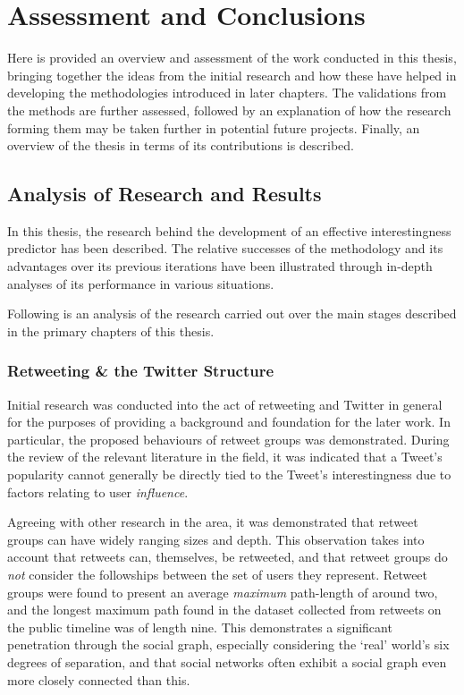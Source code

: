 \chapter{Assessment and Conclusions}
Here is provided an overview and assessment of the work conducted in this thesis, bringing together the ideas from the initial research and how these have helped in developing the methodologies introduced in later chapters. The validations from the methods are further assessed, followed by an explanation of how the research forming them may be taken further in potential future projects. Finally, an overview of the thesis in terms of its contributions is described.


\section{Analysis of Research and Results}
In this thesis, the research behind the development of an effective interestingness predictor has been described. The relative successes of the methodology and its advantages over its previous iterations have been illustrated through in-depth analyses of its performance in various situations.

Following is an analysis of the research carried out over the main stages described in the primary chapters of this thesis.

\subsection{Retweeting \& the Twitter Structure}
Initial research was conducted into the act of retweeting and Twitter in general for the purposes of providing a background and foundation for the later work. In particular, the proposed behaviours of retweet groups was demonstrated. During the review of the relevant literature in the field, it was indicated that a Tweet's popularity cannot generally be directly tied to the Tweet's interestingness due to factors relating to user \textit{influence}.

Agreeing with other research in the area, it was demonstrated that retweet groups can have widely ranging sizes and depth. This observation takes into account that retweets can, themselves, be retweeted, and that retweet groups do \textit{not} consider the followships between the set of users they represent. Retweet groups were found to present an average \textit{maximum} path-length of around two, and the longest maximum path found in the dataset collected from retweets on the public timeline was of length nine. This demonstrates a significant penetration through the social graph, especially considering the `real' world's six degrees of separation, and that social networks often exhibit a social graph even more closely connected than this.

